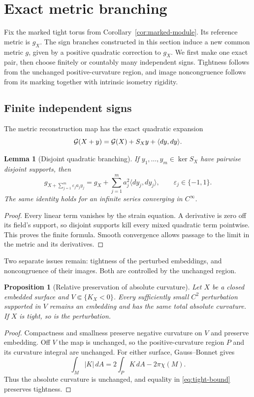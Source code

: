 \documentclass[11pt]{amsart}
\newtheorem{proposition}[theorem]{Proposition}
\newtheorem{lemma}[theorem]{Lemma}
\theoremstyle{definition}
\theoremstyle{remark}
\numberwithin{equation}{section}
\begin{document}
\section{Exact metric branching}\label{sec:reconstruction}
Fix the marked tight torus from Corollary~\ref{cor:marked-module}.
Its reference metric is $g_X$. The sign branches constructed in this
section induce a new common metric $g$, given by a positive quadratic
correction to $g_X$. We first make one exact pair, then choose finitely
or countably many independent signs. Tightness follows from the
unchanged positive-curvature region, and image noncongruence follows
from its marking together with intrinsic isometry rigidity.

\subsection{Finite independent signs}
The metric reconstruction map has the exact quadratic expansion
\begin{equation}\label{eq:metricquad}
 \mathcal G(X+y)=\mathcal G(X)+S_Xy+\langle dy,dy\rangle.
\end{equation}
\begin{lemma}[Disjoint quadratic branching]\label{thm:branch}
If $y_1,\ldots,y_m\in\ker S_X$ have pairwise disjoint supports, then
\begin{equation}\label{eq:abstractsign}
 g_{X+\sum_{j=1}^m\varepsilon_j a_jy_j}
 =g_X+\sum_{j=1}^m a_j^2\langle dy_j,dy_j\rangle,
 \qquad\varepsilon_j\in\{-1,1\}.
\end{equation}
The same identity holds for an infinite series converging in $C^\infty$.
\end{lemma}
\begin{proof}
Every linear term vanishes by the strain equation. A derivative is zero
off its field's support, so disjoint supports kill every mixed quadratic
term pointwise. This proves the finite formula. Smooth convergence allows
passage to the limit in the metric and its derivatives.
\end{proof}

Two separate issues remain: tightness of the perturbed embeddings, and
noncongruence of their images. Both are controlled by the unchanged region.
\begin{proposition}[Relative preservation of absolute curvature]\label{prop:budget}
Let $X$ be a closed embedded surface and $V\Subset\{K_X<0\}$.
Every sufficiently small $C^2$ perturbation supported in $V$ remains an
embedding and has the same total absolute curvature. If $X$ is tight,
so is the perturbation.
\end{proposition}
\begin{proof}
Compactness and smallness preserve negative curvature on $V$ and preserve
embedding. Off $V$ the map is unchanged, so the positive-curvature region
$P$ and its curvature integral are unchanged. For either surface,
Gauss--Bonnet gives
\[
 \int_M|K|\,dA=2\int_P K\,dA-2\pi\chi(M).
\]
Thus the absolute curvature is unchanged, and equality in
\eqref{eq:tight-bound} preserves tightness.
\end{proof}
\end{document}
